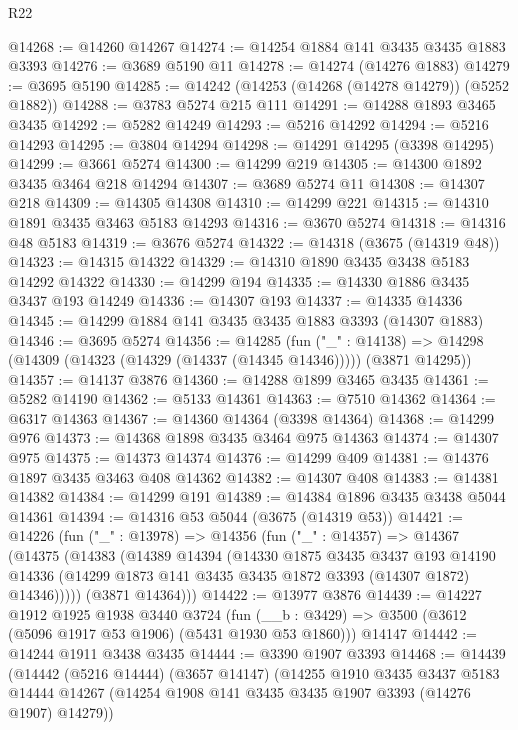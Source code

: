 \begin{lexlean}{R22}
\begin{coremodule}
@14268 := @14260 @14267
@14274 := @14254 @1884 @141 @3435 @3435 @1883 @3393
@14276 := @3689 @5190 @11
@14278 := @14274 (@14276 @1883)
@14279 := @3695 @5190
@14285 := @14242 (@14253 (@14268 (@14278 @14279)) (@5252 @1882))
@14288 := @3783 @5274 @215 @111
@14291 := @14288 @1893 @3465 @3435
@14292 := @5282 @14249
@14293 := @5216 @14292
@14294 := @5216 @14293
@14295 := @3804 @14294
@14298 := @14291 @14295 (@3398 @14295)
@14299 := @3661 @5274
@14300 := @14299 @219
@14305 := @14300 @1892 @3435 @3464 @218 @14294
@14307 := @3689 @5274 @11
@14308 := @14307 @218
@14309 := @14305 @14308
@14310 := @14299 @221
@14315 := @14310 @1891 @3435 @3463 @5183 @14293
@14316 := @3670 @5274
@14318 := @14316 @48 @5183
@14319 := @3676 @5274
@14322 := @14318 (@3675 (@14319 @48))
@14323 := @14315 @14322
@14329 := @14310 @1890 @3435 @3438 @5183 @14292 @14322
@14330 := @14299 @194
@14335 := @14330 @1886 @3435 @3437 @193 @14249
@14336 := @14307 @193
@14337 := @14335 @14336
@14345 := @14299 @1884 @141 @3435 @3435 @1883 @3393 (@14307 @1883)
@14346 := @3695 @5274
@14356 := @14285
    (fun ("_" : @14138) =>
    @14298 (@14309 (@14323 (@14329 (@14337 (@14345 @14346))))) (@3871 @14295))
@14357 := @14137 @3876
@14360 := @14288 @1899 @3465 @3435
@14361 := @5282 @14190
@14362 := @5133 @14361
@14363 := @7510 @14362
@14364 := @6317 @14363
@14367 := @14360 @14364 (@3398 @14364)
@14368 := @14299 @976
@14373 := @14368 @1898 @3435 @3464 @975 @14363
@14374 := @14307 @975
@14375 := @14373 @14374
@14376 := @14299 @409
@14381 := @14376 @1897 @3435 @3463 @408 @14362
@14382 := @14307 @408
@14383 := @14381 @14382
@14384 := @14299 @191
@14389 := @14384 @1896 @3435 @3438 @5044 @14361
@14394 := @14316 @53 @5044 (@3675 (@14319 @53))
@14421 := @14226
    (fun ("_" : @13978) =>
    @14356
      (fun ("_" : @14357) =>
      @14367
        (@14375
          (@14383
            (@14389
              @14394
              (@14330
                @1875
                @3435
                @3437
                @193
                @14190
                @14336
                (@14299 @1873 @141 @3435 @3435 @1872 @3393 (@14307 @1872) @14346)))))
        (@3871 @14364)))
@14422 := @13977 @3876
@14439 := @14227
    @1912
    @1925
    @1938
    @3440
    @3724
    (fun (__b : @3429) => @3500 (@3612 (@5096 @1917 @53 @1906) (@5431 @1930 @53 @1860)))
    @14147
@14442 := @14244 @1911 @3438 @3435
@14444 := @3390 @1907 @3393
@14468 := @14439
    (@14442
      (@5216 @14444)
      (@3657 @14147)
      (@14255
        @1910
        @3435
        @3437
        @5183
        @14444
        @14267
        (@14254 @1908 @141 @3435 @3435 @1907 @3393 (@14276 @1907) @14279))

\end{coremodule}
\end{lexlean}
